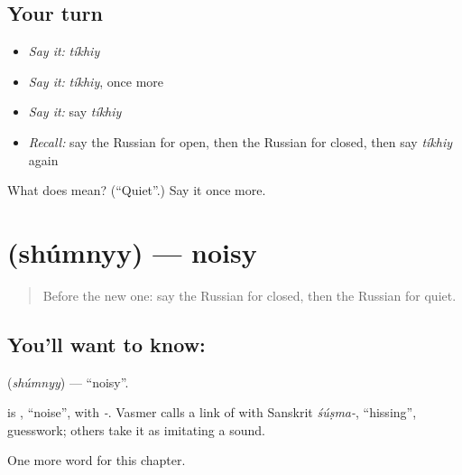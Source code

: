 \subsection*{Your turn}
\begin{itemize}
\raggedright
  \item \emph{Say it:} \emph{tíkhiy}
  \item \emph{Say it:} \emph{tíkhiy}, once more
  \item \emph{Say it:} say \emph{tíkhiy}
  \item \emph{Recall:} say the Russian for open, then the Russian for closed, then say \emph{tíkhiy} again
\end{itemize}

\begin{tcolorbox}[breakable,colback=teal!4,colframe=teal!35!black,title={Before you move on}]
What does  mean? (\textquotedblleft{}Quiet\textquotedblright{}.) Say it once more.
\end{tcolorbox}
\section[\texorpdfstring{\ru{шумный} (shúmnyy)}{шумный (shúmnyy)}]{ (shúmnyy) — noisy}

\label{lesson:RU-C125-noisy}



\begin{quote}
Before the new one: say the Russian for closed, then the Russian for quiet.
\end{quote}

\subsection*{You'll want to know: }
\textbf{} (\emph{shúmnyy}) — \textquotedblleft{}noisy\textquotedblright{}.

\begin{cousinweb}
\textbf{} is \emph{}, \textquotedblleft{}noise\textquotedblright{}, with \emph{-}. Vasmer calls a link of \emph{} with Sanskrit \emph{śúṣma-}, \textquotedblleft{}hissing\textquotedblright{}, guesswork; others take it as imitating a sound.
\end{cousinweb}

\begin{grammarlens}[title={What you've built}]
One more word for this chapter.
\end{grammarlens}

